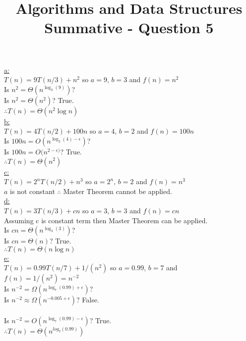 \documentclass[10pt,a4paper]{article}
\title{Algorithms and Data Structures Summative - Question 5}
\begin{document}
	\underline{a:}\\
	$T(n) = 9T(n/3) + n^2$ so $a=9$, $b=3$ and $f(n) = n^2$\\
	Is $n^2 = \Theta(n^{\log_3(9)})$?\\
	Is $n^2 = \Theta(n^{2})$? True.\\
	$\therefore T(n) = \Theta(n^2\log n)$\\
	
	\underline{b:}\\
	$T(n) = 4T(n/2) + 100n$ so $a=4$, $b=2$ and $f(n) = 100n$\\
	Is $100n = O(n^{\log_2(4) - \epsilon})$?\\
	Is $100n = O(n^{2 - \epsilon)}$? True.\\
	$\therefore T(n) = \Theta(n^2)$\\
	
	\underline{c:}\\
	$T(n) = 2^nT(n/2) + n^3$ so $a=2^n$, $b=2$ and $f(n) = n^3$\\
	$a$ is not constant $\therefore$ Master Theorem cannot be applied.\\
	
	\underline{d:}\\
	$T(n) = 3T(n/3) + cn$ so $a=3$, $b=3$ and $f(n) = cn$\\
	Assuming c is constant term then Master Theorem can be applied.\\
	Is $cn = \Theta(n^{\log_3(3)})$?\\
	Is $cn = \Theta(n)$? True.\\
	$\therefore T(n) = \Theta(n\log n)$\\
	
	\underline{e:}\\
	$T(n) = 0.99T(n/7) + 1/(n^2)$ so $a=0.99$, $b=7$ and $f(n) = 1/(n^2) = n^{-2}$\\
	Is $n^{-2} = \Omega(n^{\log_7(0.99) + \epsilon})$?\\
	Is $n^{-2} \approx \Omega(n^{-0.005 + \epsilon})$? False.\\
	\\
	Is $n^{-2} = O(n^{\log_7(0.99) - \epsilon})$? True.\\
	$\therefore T(n) = \Theta(n^{log_7(0.99)})$
\end{document}
